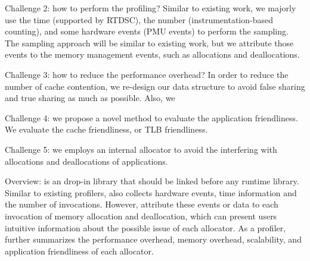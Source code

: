 Challenge 2: how to perform the profiling? Similar to existing work, we majorly use the time (supported by RTDSC), the number (instrumentation-based counting), and some hardware events (PMU events) to perform the sampling. The sampling approach will be similar to existing work, but we attribute those events to the memory management events, such as allocations and deallocations. 

Challenge 3: how to reduce the performance overhead? In order to reduce the number of cache contention, we re-design our data structure to avoid false sharing and true sharing as much as possible. Also, we 

Challenge 4: we propose a novel method to evaluate the application friendliness. We evaluate the cache friendliness, or TLB friendliness. 

Challenge 5: we employs an internal allocator to avoid the interfering with allocations and deallocations of applications.  


Overview:
\MP{} is an drop-in library that should be linked before any runtime library. Similar to existing profilers, \MP{} also collects  hardware events, time information and the number of invocations. However, \MP{} attribute these events or data to each invocation of memory allocation and deallocation, which can present users  intuitive information about the possible issue of each allocator. As a profiler, \MP{} further summarizes the performance overhead, memory overhead, scalability, and application friendliness of each allocator. 

  


  